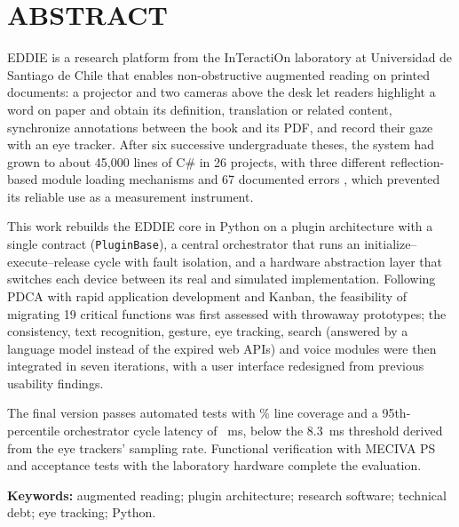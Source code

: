 \chapter*{ABSTRACT}

EDDIE is a research platform from the InTeractiOn laboratory at Universidad de Santiago de Chile that enables non-obstructive augmented reading on printed documents: a projector and two cameras above the desk let readers highlight a word on paper and obtain its definition, translation or related content, synchronize annotations between the book and its PDF, and record their gaze with an eye tracker. After six successive undergraduate theses, the system had grown to about 45,000 lines of C\# in 26 projects, with three different reflection-based module loading mechanisms and 67 documented errors \citep{ibaceta2023}, which prevented its reliable use as a measurement instrument.

This work rebuilds the EDDIE core in Python on a plugin architecture with a single contract (\texttt{PluginBase}), a central orchestrator that runs an initialize--execute--release cycle with fault isolation, and a hardware abstraction layer that switches each device between its real and simulated implementation. Following PDCA with rapid application development and Kanban, the feasibility of migrating 19 critical functions was first assessed with throwaway prototypes; the consistency, text recognition, gesture, eye tracking, search (answered by a language model instead of the expired web APIs) and voice modules were then integrated in seven iterations, with a user interface redesigned from previous usability findings.

The final version passes \PSietePruebas{} automated tests with \PSieteCobertura\% line coverage and a 95th-percentile orchestrator cycle latency of \PSieteCicloPnoventaycinco{}~ms, below the 8.3~ms threshold derived from the eye trackers' sampling rate. Functional verification with MECIVA PS and acceptance tests with the laboratory hardware complete the evaluation.

\vspace{1em}
\noindent\textbf{Keywords:} augmented reading; plugin architecture; research software; technical debt; eye tracking; Python.

